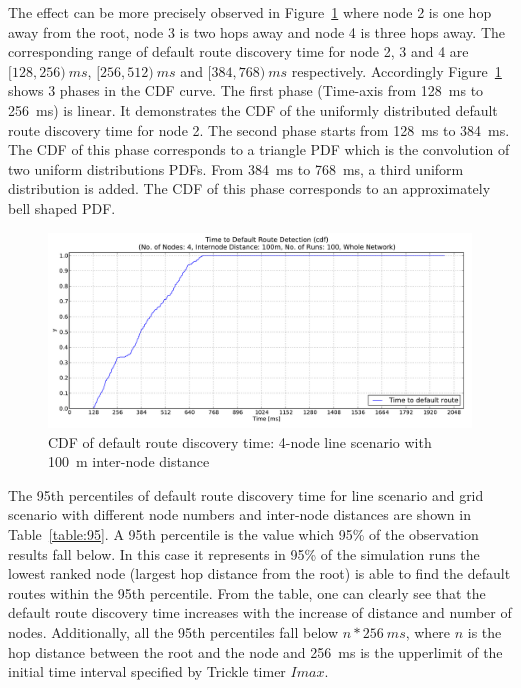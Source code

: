 The effect can be more precisely observed in Figure~\ref{fig:dist100_montecarlo_cdf_hist} where node 2 is one hop away from the root, node 3 is two hops away and node 4 is three hops away. The corresponding range of default route discovery time for node 2, 3 and 4 are $[128, 256)\:ms$, $[256, 512)\:ms$ and $[384, 768)\:ms$ respectively. Accordingly Figure~\ref{fig:dist100_montecarlo_cdf_hist} shows 3 phases in the CDF curve. The first phase (Time-axis from 128~ms to 256~ms) is linear. It demonstrates the CDF of the uniformly distributed default route discovery time for node 2. The second phase starts from 128~ms to 384~ms. The CDF of this phase corresponds to a triangle PDF which is the convolution of two uniform distributions PDFs. From 384~ms to 768~ms, a third uniform distribution is added. The CDF of this phase corresponds to an approximately bell shaped PDF.


\begin{figure}[htbp]
  \begin{center}
    \leavevmode
      \includegraphics[scale=0.38]
      {Pics/results/4/MRHOF/line/dist100_montecarlo_cdf_hist.pdf}
   \caption{CDF of default route discovery time: 4-node line scenario with 100~m inter-node distance}
    \label{fig:dist100_montecarlo_cdf_hist}
  \end{center}
   \vspace{-20pt}
\end{figure}

The 95th percentiles of default route discovery time for line scenario and grid scenario with different node numbers and inter-node distances are shown in Table~\ref{table:95}. A 95th percentile is the value which 95\% of the observation results fall below. In this case it represents in 95\% of the simulation runs the lowest ranked node (largest hop distance from the root) is able to find the default routes within the 95th percentile. From the table, one can clearly see that the default route discovery time increases with the increase of distance and number of nodes. Additionally, all the 95th percentiles fall below $n*256\:ms$, where $n$ is the hop distance between the root and the node and 256~ms is the upperlimit of the initial time interval specified by Trickle timer $Imax$.

